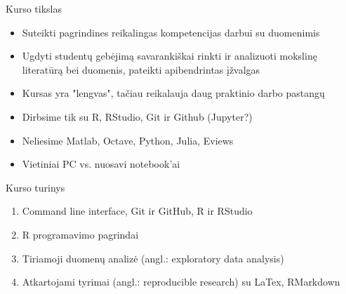 \documentclass[11pt,xcolor=table]{beamer}
\begin{document}


\begin{frame}{Kurso tikslas}
\begin{itemize}
\item Suteikti pagrindines reikalingas kompetencijas darbui su duomenimis
\item Ugdyti studentų gebėjimą savarankiškai rinkti ir analizuoti mokslinę literatūrą bei duomenis, pateikti apibendrintas įžvalgas
\item Kursas yra "lengvas", tačiau reikalauja daug praktinio darbo pastangų
\item Dirbsime tik su R, RStudio, Git ir Github (Jupyter?)
\item Neliesime Matlab, Octave, Python, Julia, Eviews
\item Vietiniai PC vs. nuosavi notebook'ai
\end{itemize}
\end{frame}



\begin{frame}{Kurso turinys}
\begin{enumerate}
\item Command line interface,  Git ir GitHub, R ir RStudio
\item R programavimo pagrindai
\item Tiriamoji duomenų analizė (angl.: exploratory data analysis)
\item Atkartojami tyrimai (angl.: reproducible research) su LaTex, RMarkdown
\end{enumerate}
\end{frame}
\end{document}
